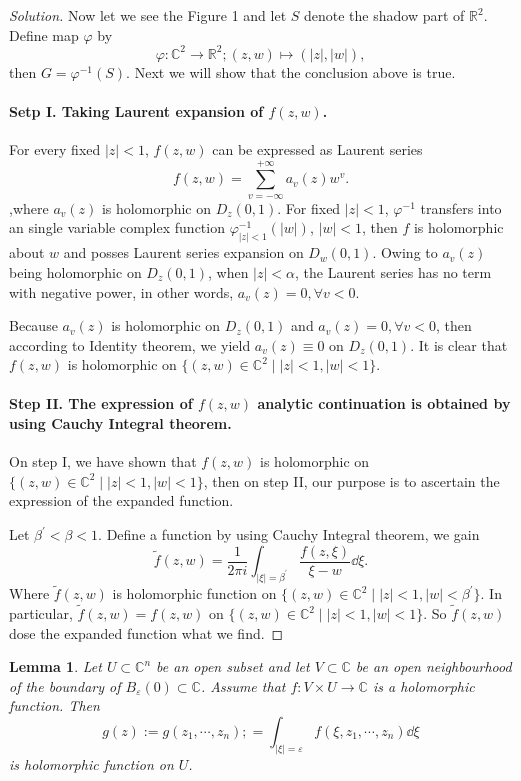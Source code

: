 \documentclass[12pt,twoside]{book}
\newcommand\R{\mathbb{R}}
\newenvironment{solution}{\begin{proof}[Solution]}{\end{proof}}
\theoremstyle{plain}
\newtheorem{lemma}[lemma]{Lemma}
\theoremstyle{definition}
\theoremstyle{remark}
\numberwithin{equation}{section}
\begin{document}
\begin{solution}
Now let we see the Figure 1 and let $S$ denote the shadow part of $\R^2$. Define map $\varphi$ by
\[\varphi\colon \mathbb{C}^2 \to \R^2 ; (z,w)\mapsto (|z|,|w|),\]
then $G=\varphi^{-1}(S)$. Next we will show that the conclusion above is true.
\paragraph{Setp I. Taking Laurent expansion of $f(z,w)$.}

For every fixed $|z|<1$, $f(z,w)$ can be expressed as Laurent series  
\[f(z,w)=\sum_{v=-\infty}^{+\infty}a_v (z)w^v.\]
,where $a_v (z)$ is holomorphic on $D_z(0,1)$. For fixed $|z|<1$, $\varphi^{-1}$ transfers into an single variable complex function $\varphi^{-1}_{|z|<1}(|w|)$, $ |w|<1$, then $f$ is holomorphic  about $w$
and posses Laurent series expansion on $D_w (0,1)$.
Owing to $a_v (z)$ being holomorphic on $D_z (0,1)$, when $|z|<\alpha$, the Laurent series has no term with negative power, in other words, $a_v (z)=0, \forall v<0$.

Because $a_v (z)$ is holomorphic on $D_z(0,1)$ and $a_v (z)=0,\forall v<0$, then according to Identity theorem, we yield $a_v (z)\equiv 0$ on $D_z(0,1)$. It is clear that $f(z,w)$ is holomorphic on $\{(z,w)\in \mathbb{C}^2\mid |z|<1,|w|<1\}$.
\paragraph{Step II. The expression of $f(z,w)$ analytic continuation is obtained by using Cauchy Integral theorem. }

On step I, we have shown that $f(z,w)$ is holomorphic on $\{(z,w)\in \mathbb{C}^2\mid |z|<1,|w|<1\}$, then on step II, our purpose is to ascertain the expression of the expanded function. 

Let $\beta^\prime<\beta<1$. Define a function by using Cauchy Integral theorem, we gain 
\begin{equation}
    \widetilde{f}(z,w)=\frac{1}{2\pi i}\int_{|\xi|=\beta^\prime} \frac{f(z,\xi)}{\xi-w}\dd \xi. 
\end{equation}
Where $\widetilde{f}(z,w)$ is holomorphic function on $\{(z,w)\in \mathbb{C}^2\mid |z|<1,|w|<\beta^\prime\}$. In particular, $\widetilde{f}(z,w)=f(z,w)$ on $\{(z,w)\in \mathbb{C}^2\mid |z|<1,|w|<1\}$. So $\widetilde{f}(z,w)$ dose the expanded function what we find. 
\end{solution}

\begin{lemma}\label{lem:1.1}
    Let $U\subset \mathbb{C}^n$ be an open subset and let $V\subset \mathbb{C} $ be an open neighbourhood of the boundary of $B_\varepsilon(0)\subset \mathbb{C}$. Assume that $f\colon V\times U\to \mathbb{C}$ is a holomorphic function. Then 
    \[g(z):=g(z_1,\cdots,z_n);=\int_{|\xi|=\varepsilon}f(\xi,z_1,\cdots,z_n)\dd \xi\]
    is holomorphic function on $U$.
\end{lemma}
\end{document}
